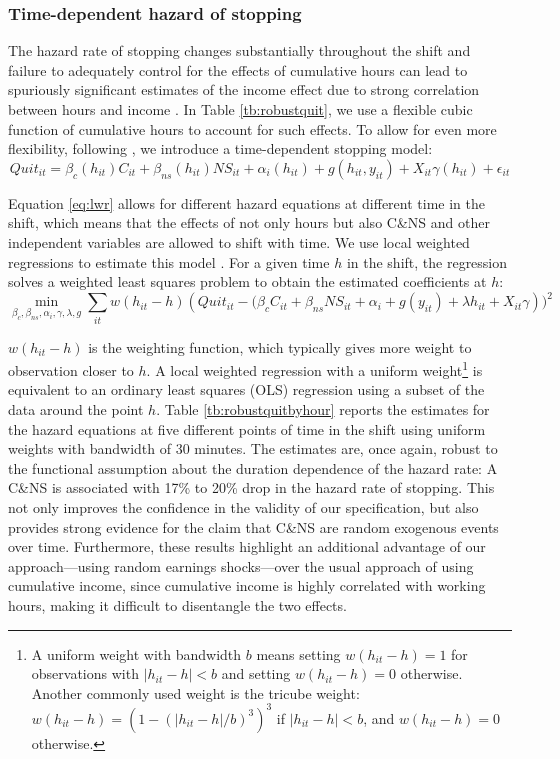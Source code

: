 \documentclass[reviewmode,AEJ]{AEA}
\begin{document}
\subsubsection{Time-dependent hazard of stopping}
The hazard rate of stopping changes substantially throughout the shift and failure to adequately control for the effects of cumulative hours can lead to spuriously significant estimates of the income effect due to strong correlation between hours and income \citep{thakral2018daily}. In Table \ref{tb:robustquit}, we use a flexible cubic function of cumulative hours to account for such effects. To allow for even more flexibility, following \cite{thakral2018daily}, we introduce a time-dependent stopping model:
\begin{equation}
\label{eq:lwr}
    Quit_{it} = \beta_c(h_{it})C_{it} + \beta_{ns}(h_{it}){NS}_{it} + \alpha_i(h_{it}) + g(h_{it}, y_{it}) + X_{it}\gamma(h_{it}) + \epsilon_{it}
\end{equation}

Equation \eqref{eq:lwr} allows for different hazard equations at different time in the shift, which means that the effects of not only hours but also C\&NS and other independent variables are allowed to shift with time. We use local weighted regressions to estimate this model \citep{cleveland1988locally}. For a given time $h$ in the shift, the regression solves a weighted least squares problem to obtain the estimated coefficients at $h$:
\[\min_{\beta_c, \beta_{ns}, \alpha_i, \gamma, \lambda, g} \sum_{it} w(h_{it}-h) \left(Quit_{it} - (\beta_cC_{it} + \beta_{ns}{NS}_{it} + \alpha_i + g(y_{it}) + \lambda h_{it} + X_{it}\gamma\right))^2\]

$w(h_{it}-h)$ is the weighting function, which typically gives more weight to observation closer to $h$. A local weighted regression with a uniform weight\footnote{A uniform weight with bandwidth $b$ means setting $w(h_{it}-h) = 1$ for observations with $|h_{it}-h|<b$ and setting $w(h_{it}-h) = 0$ otherwise. Another commonly used weight is the tricube weight: $w(h_{it}-h) = \left(1-(|h_{it}-h|/b)^3\right)^3$ if $|h_{it}-h|<b$, and $w(h_{it}-h) = 0$ otherwise.} is equivalent to an ordinary least squares (OLS) regression using a subset of the data around the point $h$. Table \ref{tb:robustquitbyhour} reports the estimates for the hazard equations at five different points of time in the shift using uniform weights with bandwidth of 30 minutes. The estimates are, once again, robust to the functional assumption about the duration dependence of the hazard rate: A C\&NS is associated with 17\% to 20\% drop in the hazard rate of stopping.  This not only improves the confidence in the validity of our specification, but also provides strong evidence for the claim that C\&NS are random exogenous events over time. Furthermore, these results highlight an additional advantage of our approach---using random earnings 
shocks---over the usual approach of using cumulative income, since cumulative income is highly correlated
with working hours, making it difficult to disentangle the two effects.  
\end{document}

